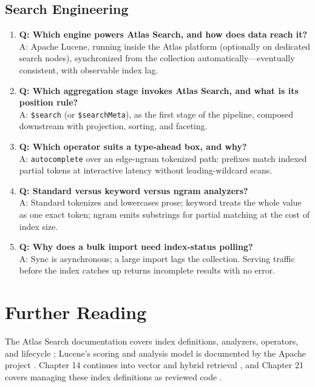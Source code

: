 \subsection{Search Engineering}
\begin{enumerate}
    \item \textbf{Q: Which engine powers Atlas Search, and how does data reach it?}\\
    A: Apache Lucene, running inside the Atlas platform (optionally on dedicated search nodes), synchronized from the collection automatically---eventually consistent, with observable index lag.

    \item \textbf{Q: Which aggregation stage invokes Atlas Search, and what is its position rule?}\\
    A: \texttt{\$search} (or \texttt{\$searchMeta}), as the first stage of the pipeline, composed downstream with projection, sorting, and faceting.

    \item \textbf{Q: Which operator suits a type-ahead box, and why?}\\
    A: \texttt{autocomplete} over an edge-ngram tokenized path: prefixes match indexed partial tokens at interactive latency without leading-wildcard scans.

    \item \textbf{Q: Standard versus keyword versus ngram analyzers?}\\
    A: Standard tokenizes and lowercases prose; keyword treats the whole value as one exact token; ngram emits substrings for partial matching at the cost of index size.

    \item \textbf{Q: Why does a bulk import need index-status polling?}\\
    A: Sync is asynchronous; a large import lags the collection. Serving traffic before the index catches up returns incomplete results with no error.
\end{enumerate}

\section{Further Reading}
The Atlas Search documentation covers index definitions, analyzers, operators, and lifecycle \cite{mongodbAtlasSearchDocs}; Lucene's scoring and analysis model is documented by the Apache project \cite{apacheLuceneRepo}. Chapter 14 continues into vector and hybrid retrieval \cite{mongodbAtlasVectorSearch}, and Chapter 21 covers managing these index definitions as reviewed code \cite{mongodbTerraformDocs}.

